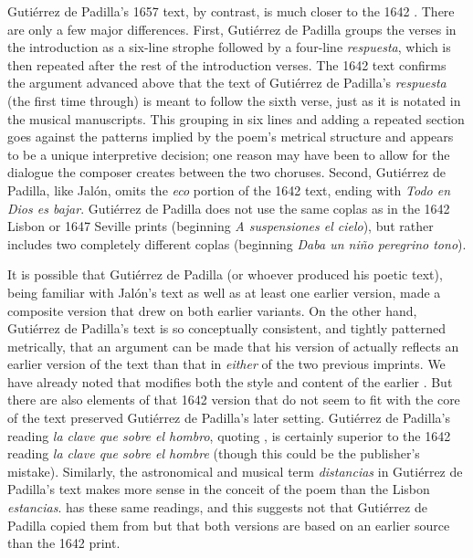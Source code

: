 Gutiérrez de Padilla's 1657 text, by contrast, is much closer to the 1642
.  
There are only a few major differences.
First, Gutiérrez de Padilla groups the verses in the introduction as a six-line
strophe followed by a four-line \emph{respuesta}, which is then repeated after
the rest of the introduction verses.
The 1642 text confirms the argument advanced above that the text of Gutiérrez de
Padilla's \emph{respuesta} (the first time through) is meant to follow the sixth
verse, just as it is notated in the musical manuscripts.
This grouping in six lines and adding a repeated section goes against the
patterns implied by the poem's metrical structure and appears to be a unique
interpretive decision; one reason may have been to allow for the dialogue the
composer creates between the two choruses.
Second, Gutiérrez de Padilla, like Jalón, omits the \emph{eco} portion of the
1642 text, ending with \emph{Todo en Dios es bajar}.
Gutiérrez de Padilla does not use the same coplas as in the 1642 Lisbon or 1647
Seville prints (beginning \emph{A suspensiones el cielo}), but rather includes
two completely different coplas (beginning \emph{Daba un niño peregrino tono}).

It is possible that Gutiérrez de Padilla (or whoever produced his poetic text),
being familiar with Jalón's text as well as at least one earlier version, made a
composite version that drew on both earlier variants.
On the other hand, Gutiérrez de Padilla's text is so conceptually consistent,
and tightly patterned metrically, that an argument can be made that his version
of  actually reflects an earlier version of the text than that in
\emph{either} of the two previous imprints.
We have already noted that  modifies both the style and content
of the earlier .
But there are also elements of that 1642 version that do not seem to fit with
the core of the text preserved Gutiérrez de Padilla's later setting.
Gutiérrez de Padilla's reading \emph{la clave que sobre el hombro}, quoting
, is certainly superior to the 1642 reading \emph{la clave
que sobre el hombre} (though this could be the publisher's mistake).
Similarly, the astronomical and musical term \emph{distancias} in Gutiérrez de
Padilla's text makes more sense in the conceit of the poem than the Lisbon
\emph{estancias}.
 has these same readings, and this suggests not that Gutiérrez
de Padilla copied them from  but that both versions are based
on an earlier source than the 1642 print.

